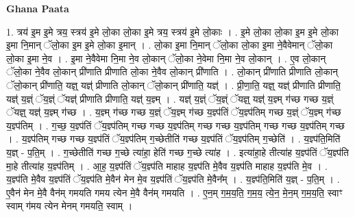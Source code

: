 \documentclass[17pt]{extarticle}
\begin{document}
\textbf{Ghana Paata } \newline

1. त्रय॑ इ॒म इ॒मे त्रय॒ स्त्रय॑ इ॒मे लो॒का लो॒का इ॒मे त्रय॒ स्त्रय॑ इ॒मे लो॒काः । . इ॒मे लो॒का लो॒का इ॒म इ॒मे लो॒का इ॒मा नि॒मान् ॅलो॒का इ॒म इ॒मे लो॒का इ॒मान् । . लो॒का इ॒मा नि॒मान् ॅलो॒का लो॒का इ॒मा ने॒वैवेमान् ॅलो॒का लो॒का इ॒मा ने॒व । . इ॒मा ने॒वैवेमा नि॒मा ने॒व लो॒कान् ॅलो॒का ने॒वेमा नि॒मा ने॒व लो॒कान् । . ए॒व लो॒कान् ॅलो॒का ने॒वैव लो॒कान् प्री॑णाति प्रीणाति लो॒का ने॒वैव लो॒कान् प्री॑णाति । . लो॒कान् प्री॑णाति प्रीणाति लो॒कान् ॅलो॒कान् प्री॑णाति॒ यज्ञ्॒ यज्ञ्॑ प्रीणाति लो॒कान् ॅलो॒कान् प्री॑णाति॒ यज्ञ्॑ । . प्री॒णा॒ति॒ यज्ञ्॒ यज्ञ्॑ प्रीणाति प्रीणाति॒ यज्ञ्॑ य॒ज्ञ्ं ॅय॒ज्ञ्ं ॅयज्ञ्॑ प्रीणाति प्रीणाति॒ यज्ञ्॑ य॒ज्ञ्म् । . यज्ञ्॑ य॒ज्ञ्ं ॅय॒ज्ञ्ं ॅयज्ञ्॒ यज्ञ्॑ य॒ज्ञ्म् ग॑च्छ गच्छ य॒ज्ञ्ं ॅयज्ञ्॒ यज्ञ्॑ य॒ज्ञ्म् ग॑च्छ । . य॒ज्ञ्म् ग॑च्छ गच्छ य॒ज्ञ्ं ॅय॒ज्ञ्म् ग॑च्छ य॒ज्ञ्प॑तिं ॅय॒ज्ञ्प॑तिम् गच्छ य॒ज्ञ्ं ॅय॒ज्ञ्म् ग॑च्छ य॒ज्ञ्प॑तिम् । . ग॒च्छ॒ य॒ज्ञ्प॑तिं ॅय॒ज्ञ्प॑तिम् गच्छ गच्छ य॒ज्ञ्प॑तिम् गच्छ गच्छ य॒ज्ञ्प॑तिम् गच्छ गच्छ य॒ज्ञ्प॑तिम् गच्छ । . य॒ज्ञ्प॑तिम् गच्छ गच्छ य॒ज्ञ्प॑तिं ॅय॒ज्ञ्प॑तिम् ग॒च्छेतीति॑ गच्छ य॒ज्ञ्प॑तिं ॅय॒ज्ञ्प॑तिम् ग॒च्छेति॑ । . य॒ज्ञ्प॑ति॒मिति॑ य॒ज्ञ् - प॒ति॒म् । . ग॒च्छेतीति॑ गच्छ ग॒च्छे त्या॑हा॒ हेति॑ गच्छ ग॒च्छे त्या॑ह । . इत्या॑हा॒हे तीत्या॑ह य॒ज्ञ्प॑तिं ॅय॒ज्ञ्प॑ति मा॒हे तीत्या॑ह य॒ज्ञ्प॑तिम् । . आ॒ह॒ य॒ज्ञ्प॑तिं ॅय॒ज्ञ्प॑ति माहाह य॒ज्ञ्प॑ति मे॒वैव य॒ज्ञ्प॑ति माहाह य॒ज्ञ्प॑ति मे॒व । . य॒ज्ञ्प॑ति मे॒वैव य॒ज्ञ्प॑तिं ॅय॒ज्ञ्प॑ति मे॒वैन॑ मेन मे॒व य॒ज्ञ्प॑तिं ॅय॒ज्ञ्प॑ति मे॒वैन᳚म् । . य॒ज्ञ्प॑ति॒मिति॑ य॒ज्ञ् - प॒ति॒म् । . ए॒वैन॑ मेन मे॒वै वैन॑म् गमयति गमय त्येन मे॒वै वैन॑म् गमयति । . ए॒न॒म् ग॒म॒य॒ति॒ ग॒म॒य॒ त्ये॒न॒ मे॒न॒म् ग॒म॒य॒ति॒ स्वाꣳ स्वाम् ग॑मय त्येन मेनम् गमयति॒ स्वाम् । \newline
\end{document}
